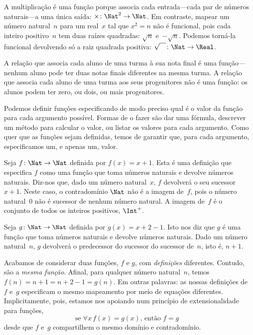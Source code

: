 \documentclass[../../../include/open-logic-section]{subfiles}
\begin{document}
\begin{ex}
A multiplicação é uma função porque associa cada entrada---cada par
de números naturais---a uma única saída: $\times \colon \Nat^2 \to
\Nat$. Em contraste, mapear um número natural~$n$ para um real~$x$ tal
que $x^2 = n$ não é funcional, pois cada inteiro positivo~$n$ tem duas
raízes quadradas: $\sqrt{n}$ e~$-\sqrt{n}$. Podemos torná-la funcional
devolvendo só a raiz quadrada positiva: $\sqrt{\phantom{X}} \colon
\Nat \to \Real$.
\end{ex}

\begin{ex}
A relação que associa cada aluno de uma turma à sua nota final
é uma função---nenhum aluno pode ter duas notas finais diferentes na
mesma turma. A relação que associa cada aluno de uma turma aos seus
progenitores não é uma função: os alunos podem ter zero, ou dois, ou mais
progenitores.
\end{ex}

\begin{explain}
Podemos definir funções especificando de modo preciso qual é o
valor da função para cada argumento possível. Formas de o fazer são dar uma fórmula, descrever um método para calcular
o valor, ou listar os valores para cada argumento. Como quer que as funções sejam definidas, temos de garantir que, para cada argumento, especificamos um,
e apenas um, valor.
\end{explain}


\begin{ex}
Seja $f \colon \Nat \to \Nat$ definida por $f(x) = x+1$. Esta
é uma definição que especifica $f$ como uma função que toma
números naturais e devolve números naturais. Diz-nos que, dado um
número natural~$x$, $f$ devolverá o seu sucessor~$x+1$.
Neste caso, o contradomínio $\Nat$ não é a imagem de~$f$, pois o
número natural~$0$ não é sucessor de nenhum número natural. A
imagem de~$f$ é o conjunto de todos os inteiros positivos, $\Int^{+}$.
\end{ex}

\begin{ex}
Seja $g \colon \Nat \to \Nat$ definida por $g(x) = x+2-1$. Isto
nos diz que $g$ é uma função que toma números naturais e
devolve números naturais. Dado um número natural~$n$, $g$ devolverá
o predecessor do sucessor do sucessor de~$n$, isto é,
$n+1$.
\end{ex}

\begin{explain}
Acabamos de considerar duas funções, $f$ e $g$, com
\emph{definições} diferentes. Contudo, são a \emph{mesma função}. Afinal,
para qualquer número natural~$n$, temos $f(n) = n+1 = n+2-1 =
g(n)$. Em outras palavras: as nossas definições de $f$ e~$g$ especificam o
mesmo mapeamento por meio de equações diferentes. Implicitamente, pois,
estamos nos apoiando num princípio de extensionalidade para funções,
\[
  \text{se }\forall x\, f(x) = g(x)\text{, então }f = g
\]
desde que $f$ e~$g$ compartilhem o mesmo domínio e contradomínio.
\end{explain}
\end{document}
